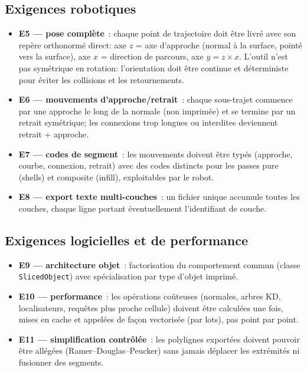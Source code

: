 \documentclass[11pt,a4paper]{article}
\begin{document}
\subsection{Exigences robotiques}
\begin{itemize}
  \item \textbf{E5 --- pose complète}~: chaque point de trajectoire doit
        être livré avec son repère orthonormé direct: axe $z$ = axe
        d'approche (normal à la surface, pointé vers la surface), axe
        $x$ = direction de parcours, axe $y = z \times x$. L'outil n'est
        pas symétrique en rotation: l'orientation doit être continue et
        déterministe pour éviter les collisions et les retournements.
  \item \textbf{E6 --- mouvements d'approche/retrait}~: chaque
        sous-trajet commence par une approche le long de la normale
        (non imprimée) et se termine par un retrait symétrique; les
        connexions trop longues ou interdites deviennent
        retrait + approche.
  \item \textbf{E7 --- codes de segment}~: les mouvements doivent être
        typés (approche, courbe, connexion, retrait) avec des codes
        distincts pour les passes \og pure \fg{} (shells) et
        \og composite \fg{} (infill), exploitables par le robot.
  \item \textbf{E8 --- export texte multi-couches}~: un fichier unique
        accumule toutes les couches, chaque ligne portant
        éventuellement l'identifiant de couche.
\end{itemize}

\subsection{Exigences logicielles et de performance}
\begin{itemize}
  \item \textbf{E9 --- architecture objet}~: factorisation du
        comportement commun (classe \texttt{SlicedObject}) avec
        spécialisation par type d'objet imprimé.
  \item \textbf{E10 --- performance}~: les opérations coûteuses
        (normales, arbres KD, localisateurs, requêtes plus proche
        cellule) doivent être calculées une fois, mises en cache et
        appelées de façon vectorisée (par lots), pas point par point.
  \item \textbf{E11 --- simplification contrôlée}~: les polylignes
        exportées doivent pouvoir être allégées (Ramer--Douglas--Peucker)
        sans jamais déplacer les extrémités ni fusionner des segments.
\end{itemize}
\end{document}
